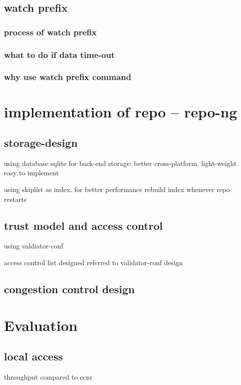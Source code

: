 \documentclass[conference]{IEEEtran}
\begin{document}
\subsection{watch prefix}

\subsubsection{process of watch prefix}

\subsubsection{what to do if data time-out}

\subsubsection{why use watch prefix command}

\section{implementation of repo -- repo-ng} \label{section-implementation}
\subsection{storage-design}
using database sqlite for back-end storage: better cross-platform, light-weight easy to implement

using skiplist as index. for better performance rebuild index whenever repo restarts

\subsection{trust model and access control}
using valdiator-conf

access control list designed referred to validator-conf design

\subsection{congestion control design}

\section{Evaluation} \label{section-evaluation}

\subsection{local access}
throughput compared to ccnr
\end{document}
